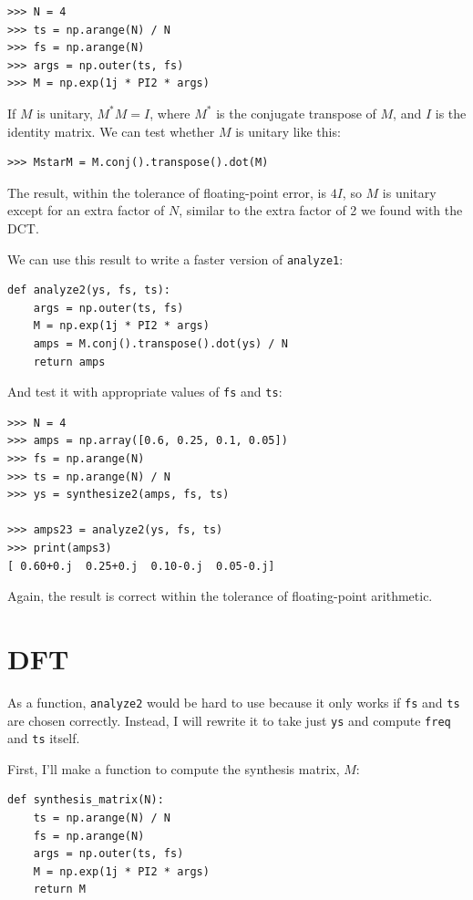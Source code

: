 \documentclass[12pt]{book}
\begin{document}
\begin{verbatim}
>>> N = 4
>>> ts = np.arange(N) / N
>>> fs = np.arange(N)
>>> args = np.outer(ts, fs)
>>> M = np.exp(1j * PI2 * args)
\end{verbatim}

If $M$ is unitary, $M^*M = I$, where $M^*$ is the conjugate transpose
of $M$, and $I$ is the identity matrix.  We can test whether $M$
is unitary like this:

\begin{verbatim}
>>> MstarM = M.conj().transpose().dot(M)
\end{verbatim}

The result, within the tolerance of floating-point error, is
$4 I$, so $M$ is unitary except for an extra factor of $N$,
similar to the extra factor of 2 we found with the DCT.

We can use this result to write a faster version of {\tt analyze1}:

\begin{verbatim}
def analyze2(ys, fs, ts):
    args = np.outer(ts, fs)
    M = np.exp(1j * PI2 * args)
    amps = M.conj().transpose().dot(ys) / N
    return amps
\end{verbatim}

And test it with appropriate values of {\tt fs} and {\tt ts}:

\begin{verbatim}
>>> N = 4
>>> amps = np.array([0.6, 0.25, 0.1, 0.05])
>>> fs = np.arange(N)
>>> ts = np.arange(N) / N
>>> ys = synthesize2(amps, fs, ts)

>>> amps23 = analyze2(ys, fs, ts)
>>> print(amps3)
[ 0.60+0.j  0.25+0.j  0.10-0.j  0.05-0.j]
\end{verbatim}

Again, the result is correct within the tolerance of floating-point
arithmetic.


\section{DFT}
\label{dftsection}

As a function, {\tt analyze2} would be hard to use because it
only works if {\tt fs} and {\tt ts} are chosen correctly.
Instead, I will rewrite it to take just {\tt ys} and compute {\tt freq}
and {\tt ts} itself.

First, I'll make a function to compute the synthesis matrix, $M$:

\begin{verbatim}
def synthesis_matrix(N):
    ts = np.arange(N) / N
    fs = np.arange(N)
    args = np.outer(ts, fs)
    M = np.exp(1j * PI2 * args)
    return M
\end{verbatim}
\end{document}
